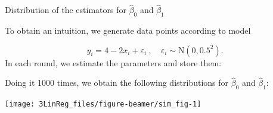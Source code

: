\documentclass[10pt,ignorenonframetext,]{beamer}
\newenvironment{Shaded}{\begin{snugshade}}{\end{snugshade}}
\newcommand{\KeywordTok}[1]{\textcolor[rgb]{0.13,0.29,0.53}{\textbf{#1}}}
\newcommand{\DataTypeTok}[1]{\textcolor[rgb]{0.13,0.29,0.53}{#1}}
\newcommand{\DecValTok}[1]{\textcolor[rgb]{0.00,0.00,0.81}{#1}}
\newcommand{\FloatTok}[1]{\textcolor[rgb]{0.00,0.00,0.81}{#1}}
\newcommand{\StringTok}[1]{\textcolor[rgb]{0.31,0.60,0.02}{#1}}
\newcommand{\OtherTok}[1]{\textcolor[rgb]{0.56,0.35,0.01}{#1}}
\newcommand{\ControlFlowTok}[1]{\textcolor[rgb]{0.13,0.29,0.53}{\textbf{#1}}}
\newcommand{\OperatorTok}[1]{\textcolor[rgb]{0.81,0.36,0.00}{\textbf{#1}}}
\newcommand{\NormalTok}[1]{#1}
\begin{document}
\begin{frame}[fragile]

\begin{block}{Distribution of the estimators for \(\hat\beta_0\) and
\(\hat\beta_1\)}

\vspace{2mm} To obtain an intuition, we generate data points according
to model

\[y_i = 4 - 2x_i + \varepsilon_i \ , \quad \varepsilon_i\sim \text{N}(0,0.5^2). \]
In each round, we estimate the parameters and store them: \tiny

\begin{Shaded}
\end{Shaded}

\normalsize
Doing it 1000 times, we obtain the following distributions for
\(\hat\beta_0\) and \(\hat\beta_1\):

\begin{center}\texttt{[image: 3LinReg\_files/figure-beamer/sim\_fig-1]} \end{center}

\end{block}

\end{frame}
\end{document}

